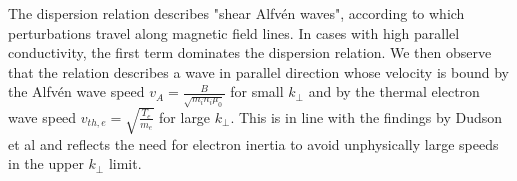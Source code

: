The dispersion relation describes "shear Alfvén waves", according to which perturbations travel along magnetic field lines. In cases with high parallel conductivity, the first term dominates the dispersion relation. We then observe that the relation describes a wave in parallel direction whose velocity is bound by the Alfvén wave speed $v_A = \frac{B}{\sqrt{m_in_i\mu_0}}$ for small $k_\perp$ and by the thermal electron wave speed $v_ {th,e} = \sqrt{\frac{T_e}{m_e}}$ for large $k_\perp$. This is in line with the findings by Dudson et al \cite{Dudson2021} and reflects the need for electron inertia to avoid unphysically large speeds in the upper $k_\perp$ limit.


